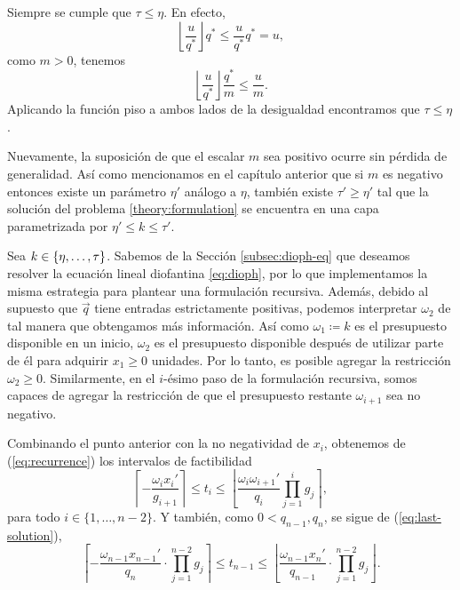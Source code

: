 \begin{observation}
	Siempre se cumple que $\tau \leq \eta$. En efecto,
	\begin{equation*}
		\left\lfloor \frac{u}{q^*} \right\rfloor q^*
		\leq \frac{u}{q^*} q^* = u,
	\end{equation*}
	como $m > 0$, tenemos
	\begin{equation*}
		\left\lfloor \frac{u}{q^*} \right\rfloor \frac{q^*}{m}
		\leq \frac{u}{m}.
	\end{equation*}
	Aplicando la función piso a ambos lados de la desigualdad encontramos que $\tau \leq \eta$.
\end{observation}
\begin{observation}
	Nuevamente, la suposición de que el escalar $m$ sea positivo ocurre sin pérdida de generalidad.
	Así como mencionamos en el capítulo anterior que si $m$ es negativo entonces existe un parámetro
	$\eta'$ análogo a $\eta$, también existe $\tau' \geq \eta'$ tal que la solución del problema
	\eqref{theory:formulation} se encuentra en una capa parametrizada por $\eta' \leq k \leq \tau'$.
\end{observation}

Sea $k \in \lbrace \eta, \ldots, \tau \rbrace$. Sabemos de la Sección \ref{subsec:dioph-eq} que deseamos
resolver la ecuación lineal diofantina \eqref{eq:dioph}, por lo que implementamos la misma
estrategia para plantear una formulación recursiva. Además, debido al supuesto que $\vec{q}$ tiene
entradas estrictamente positivas, podemos interpretar $\omega_2$ de tal manera que obtengamos más
información. Así como $\omega_1 \coloneq k$  es el presupuesto disponible en un inicio, $\omega_2$
es el presupuesto disponible después de utilizar parte de él para adquirir $x_1 \geq 0$ unidades.
Por lo tanto, es posible agregar la restricción $\omega_2 \geq 0$. Similarmente, en el $i$-ésimo
paso de la formulación recursiva, somos capaces de agregar la restricción de que el presupuesto
restante $\omega_{i + 1}$ sea no negativo.

Combinando el punto anterior con la no negatividad de $x_i$, obtenemos de (\ref{eq:recurrence}) los
intervalos de factibilidad
\begin{equation}
	\label{phase-1:finite:eq:param-bounds}
	\left\lceil -\frac{\omega_ix_i'}{g_{i+1}} \right\rceil
	\leq
	t_i
	\leq
	\left\lfloor \frac{\omega_i\omega_{i+1}'}{q_i} \prod_{j=1}^{i}g_j \right\rceil,
\end{equation}
para todo $i \in \lbrace 1, \ldots, n - 2\rbrace$. Y también, como $0 < q_{n - 1}, q_n$, se sigue de
(\ref{eq:last-solution}),
\begin{equation}
	\label{phase-1:finite:eq:param-bounds-last}
	\left\lceil -\frac{\omega_{n-1}x_{n-1}'}{q_n} \cdot \prod_{j=1}^{n-2}g_j \right\rceil
	\leq
	t_{n - 1}
	\leq
	\left\lfloor \frac{\omega_{n-1}x_{n}'}{q_{n-1}} \cdot \prod_{j=1}^{n-2}g_j \right\rfloor.
\end{equation}

